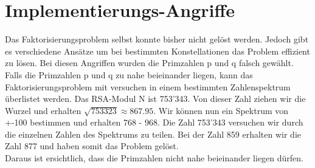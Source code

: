 \section{Implementierungs-Angriffe}
Das Faktorisierungsproblem selbst konnte bisher nicht gelöst werden. Jedoch gibt es verschiedene Ansätze um bei bestimmten Konstellationen das Problem effizient zu lösen. Bei diesen Angriffen wurden die Primzahlen p und q falsch gewählt.\\
Falls die Primzahlen p und q zu nahe beieinander liegen, kann das Faktorisierungsproblem mit versuchen in einem bestimmten Zahlenspektrum überlistet werden. Das RSA-Modul N ist 753'343. Von dieser Zahl ziehen wir die Wurzel und erhalten $ \sqrt{753323} \approx 867.95 $. Wir können nun ein Spektrum von +-100 bestimmen und erhalten 768 - 968. Die Zahl 753'343 versuchen wir durch die einzelnen Zahlen des Spektrums zu teilen. Bei der Zahl 859 erhalten wir die Zahl 877 und haben somit das Problem gelöst.\\
Daraus ist ersichtlich, dass die Primzahlen nicht nahe beieinander liegen dürfen.%
%
